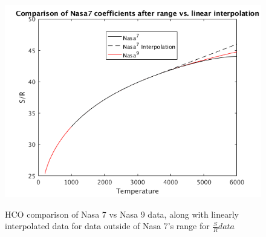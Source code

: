 \documentclass{article}
\begin{document}
\begin{figure}
  \centering
  \includegraphics[width=.8\linewidth]{./NasaPlots/ST.png}
  \label{fig:sT}
  \caption{HCO comparison of Nasa 7 vs Nasa 9 data, along with linearly interpolated data for data outside of Nasa 7's range for $\frac{S}{R} data$}
\end{figure}
\end{document}
